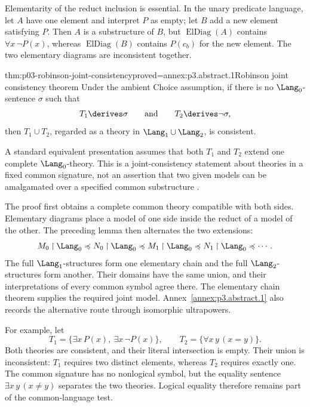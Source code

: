 Elementarity of the reduct inclusion is essential.  In the unary
predicate language, let \(A\) have one element and interpret \(P\)
as empty; let \(B\) add a new element satisfying \(P\).
Then \(A\) is a substructure of \(B\), but
\(\operatorname{ElDiag}(A)\) contains \(\forall x\,\neg P(x)\),
whereas \(\operatorname{ElDiag}(B)\) contains \(P(c_b)\) for the new
element.  The two elementary diagrams are inconsistent together.

\begin{hbtheorem}{thm:p03-robinson-joint-consistency}{proved=annex:p3.abstract.1}{Robinson joint consistency theorem}
Under the ambient Choice assumption, if there is no
\(\Lang_0\)-sentence \(\sigma\) such that
\[
 T_1\derives\sigma
 \qquad\text{and}\qquad
 T_2\derives\neg\sigma,
\]
then \(T_1\cup T_2\), regarded as a theory in
\(\Lang_1\cup\Lang_2\), is consistent.
\end{hbtheorem}

A standard equivalent presentation assumes that both \(T_1\) and \(T_2\)
extend one complete \(\Lang_0\)-theory.  This is a joint-consistency statement
about theories in a fixed common signature, not an assertion that two given
models can be amalgamated over a specified common substructure
\cite{RobinsonJointConsistency1956}.

The proof first obtains a complete common theory compatible with both
sides.  Elementary diagrams place a model of one side inside the reduct
of a model of the other.  The preceding lemma then alternates the two
extensions:
\[
 M_0\mathbin{\upharpoonright}\Lang_0\preccurlyeq N_0\mathbin{\upharpoonright}\Lang_0
 \preccurlyeq M_1\mathbin{\upharpoonright}\Lang_0\preccurlyeq N_1\mathbin{\upharpoonright}\Lang_0
 \preccurlyeq\cdots .
\]
The full \(\Lang_1\)-structures form one elementary chain and the full
\(\Lang_2\)-structures form another.  Their domains have the same union,
and their interpretations of every common symbol agree there.
The elementary chain theorem supplies the required joint model.
Annex~\ref{annex:p3.abstract.1} also records the alternative route
through isomorphic ultrapowers.

For example, let
\[
 T_1=\{\exists x\,P(x),\ \exists x\,\neg P(x)\},
 \qquad T_2=\{\forall x\,y\,(x=y)\}.
\]
Both theories are consistent, and their literal intersection is empty.
Their union is inconsistent: \(T_1\) requires two distinct elements,
whereas \(T_2\) requires exactly one.
The common signature has no nonlogical symbol, but the equality sentence
\(\exists x\,y\,(x\ne y)\) separates the two theories.
Logical equality therefore remains part of the common-language test.

